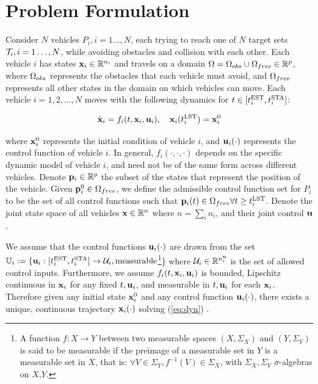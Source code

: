 \section{Problem Formulation \label{sec:formulation}}
Consider $N$ vehicles $P_i,i=1\ldots,N$, each trying to reach one of $N$ target sets $\mathcal{T}_i,i=1\ldots,N$, while avoiding obstacles and collision with each other. Each vehicle $i$ has states $\mathbf{x}_i\in \mathbb{R}^{n_i}$ and travels on a domain $\Omega=\Omega_{obs} \cup \Omega_{free}\in\mathbb{R}^p$, where $\Omega_{obs}$ represents the obstacles that each vehicle must avoid, and $\Omega_{free}$ represents all other states in the domain on which vehicles can move. Each vehicle $i = 1,2,\ldots,N$ moves with the following dynamics for $t\in[t^{\text{EST}}_i, t^{\text{STA}}_i]$:

\begin{equation} \label{eq:dyn}
\dot{\mathbf{x}}_i = f_i (t, \mathbf{x}_i, \mathbf{u}_i), \quad\mathbf{x}_i(t^{\text{LST}}_i) = \mathbf{x}_i^0 
\end{equation}

\noindent where $\mathbf{x}_i^0$ represents the initial condition of vehicle $i$, and $\mathbf{u}_i(\cdot)$ represents the control function of vehicle $i$. In general, $f_i(\cdot,\cdot,\cdot)$ depends on the specific dynamic model of vehicle $i$, and need not be of the same form across different vehicles. Denote $\mathbf{p}_i\in\mathbb{R}^p$ the subset of the states that represent the position of the vehicle. Given $\mathbf{p}_i^0\in\Omega_{free}$, we define the admissible control function set for $P_i$ to be the set of all control functions such that $\mathbf{p}_i(t) \in \Omega_{free} \forall t\ge t^{\text{LST}}_i$. Denote the joint state space of all vehicles $\mathbf{x} \in \mathbb{R}^n$ where $n = \sum_i n_i$, and their joint control $\mathbf{u}$.

We assume that the control functions $\mathbf{u}_i(\cdot)$ are drawn from the set $\mathbb{U}_i := \{\mathbf{u}_i: [t^{\text{EST}}_i, t^{\text{STA}}_i] \rightarrow \mathcal{U}_i, \text{measurable}$\footnote{
A function $f:X\to Y$ between two measurable spaces $(X,\Sigma_X)$ and $(Y,\Sigma_Y)$ is said to be measurable if the preimage of a measurable set in $Y$ is a measurable set in $X$, that is: $\forall V\in\Sigma_Y, f^{-1}(V)\in\Sigma_X$, with $\Sigma_X,\Sigma_Y$ $\sigma$-algebras on $X$,$Y$.}\} where $\mathcal{U}_i \in \mathbb{R}^{n^{\mathbf{u}}_i}$ is the set of allowed control inputs. Furthermore, we assume $f_i(t,\mathbf{x}_i, \mathbf{u}_i)$ is bounded, Lipschitz continuous in $\mathbf{x}_i$ for any fixed $t,\mathbf{u}_i$, and measurable in $t, \mathbf{u}_i$ for each $\mathbf{x}_i$. Therefore given any initial state $\mathbf{x}_i^0$ and any control function $\mathbf{u}_i(\cdot)$, there exists a unique, continuous trajectory $\mathbf{x}_i(\cdot)$ solving (\ref{eq:dyn}) \cite{coddington55}.

